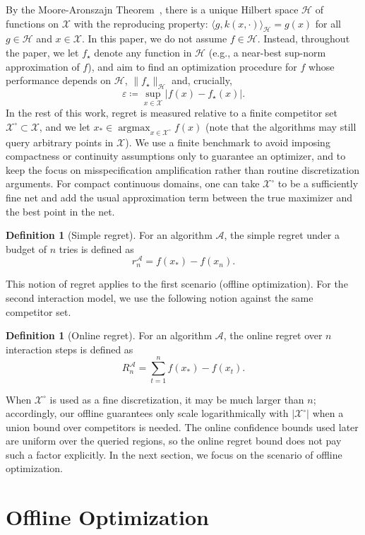 \documentclass{article}
\DeclareMathOperator*{\argmax}{argmax}
\let\cite\citep
\numberwithin{theorem}{section}
\theoremstyle{definition}
\newtheorem{definition}[theorem]{Definition}
\newcommand{\fwithin}{f_\star}
\newcommand{\Hs}{\mathcal H}
\newcommand{\Xs}{\mathcal X}
\begin{document}
By the Moore-Aronszajn Theorem~\cite{aronszajn1950theory}, there is a unique Hilbert space $\Hs$ of functions on $\Xs$ with the reproducing property: $\langle g,k(x,\cdot)\rangle_{\Hs} = g(x)$ for all $g\in \Hs$ and $x\in \Xs$.
In this paper, we do not assume $f\in \Hs$. Instead, throughout the paper, we let $\fwithin$ denote any function in $\Hs$ (e.g., a near-best sup-norm approximation of $f$), and aim to find an optimization procedure for $f$ whose performance depends on $\Hs$, $\|\fwithin\|_{\Hs}$ and, crucially,
$$\boxed{\varepsilon\coloneqq\sup_{x\in \Xs} |f(x)-\fwithin(x)|}.$$
In the rest of this work, regret is measured relative to a finite competitor set $\Xs^\circ \subset \Xs$, and we let $x_*\in \argmax_{x\in \Xs^\circ} f(x)$ (note that the algorithms may still query arbitrary points in $\Xs$).
We use a finite benchmark to avoid imposing compactness or continuity assumptions only to guarantee an optimizer, and to keep the focus on misspecification amplification rather than routine discretization arguments.
For compact continuous domains, one can take $\Xs^\circ$ to be a sufficiently fine net and add the usual approximation term between the true maximizer and the best point in the net.
\begin{definition}[Simple regret]
    For an algorithm $\mathscr A$, the simple regret under a budget
    of $n$ tries is defined as 
    $$r_n^{\mathscr A}=f(x_*)-f(x_n).$$
\end{definition}
This notion of regret applies to the first scenario (offline optimization). For the second interaction model, we use the following notion against the same competitor set.
\begin{definition}[Online regret]\label{def:online}
    For an algorithm $\mathscr A$, the online regret over $n$ interaction steps is defined as $$R_n^{\mathscr A}=\sum_{t=1}^nf(x_*)-f(x_t).$$
\end{definition}
When $\Xs^\circ$ is used as a fine discretization, it may be much larger than $n$; accordingly, our offline guarantees only scale logarithmically with $|\Xs^\circ|$ when a union bound over competitors is needed. The online confidence bounds used later are uniform over the queried regions, so the online regret bound does not pay such a factor explicitly.
In the next section, we focus on the scenario of offline optimization.

\section{Offline Optimization}\label{sec:offline}
\end{document}
